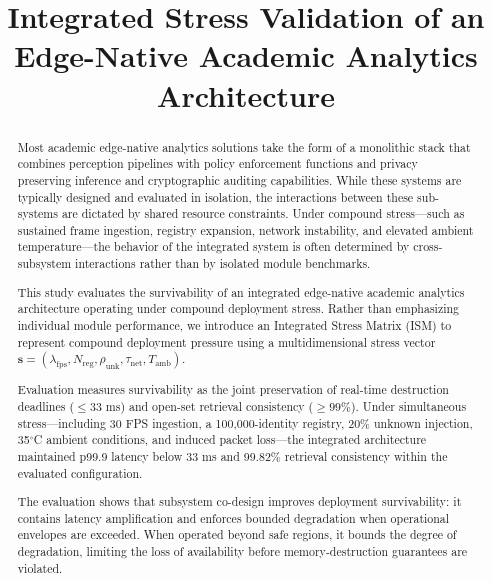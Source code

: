 \documentclass[conference]{IEEEtran}
\begin{document}
\title{Integrated Stress Validation of an Edge-Native Academic Analytics Architecture}

\author{
}

\maketitle

\begin{abstract}
Most academic edge-native analytics solutions take the form of a monolithic stack that combines perception pipelines with policy enforcement functions and privacy preserving inference and cryptographic auditing capabilities. While these systems are typically designed and evaluated in isolation, the interactions between these sub-systems are dictated by shared resource constraints. Under compound stress—such as sustained frame ingestion, registry expansion, network instability, and elevated ambient temperature—the behavior of the integrated system is often determined by cross-subsystem interactions rather than by isolated module benchmarks.

This study evaluates the survivability of an integrated edge-native academic analytics architecture operating under compound deployment stress. Rather than emphasizing individual module performance, we introduce an Integrated Stress Matrix (ISM) to represent compound deployment pressure using a multidimensional stress vector $\mathbf{s} = (\lambda_{\mathrm{fps}}, N_{\mathrm{reg}}, \rho_{\mathrm{unk}}, \tau_{\mathrm{net}}, T_{\mathrm{amb}})$.

Evaluation measures survivability as the joint preservation of real-time destruction deadlines ($\le 33$ ms) and open-set retrieval consistency ($\ge 99\%$). Under simultaneous stress—including 30 FPS ingestion, a 100,000-identity registry, 20\% unknown injection, 35$^\circ$C ambient conditions, and induced packet loss—the integrated architecture maintained p99.9 latency below 33 ms and 99.82\% retrieval consistency within the evaluated configuration.

The evaluation shows that subsystem co-design improves deployment survivability: it contains latency amplification and enforces bounded degradation when operational envelopes are exceeded. When operated beyond safe regions, it bounds the degree of degradation, limiting the loss of availability before memory-destruction guarantees are violated.
\end{abstract}
\end{document}
